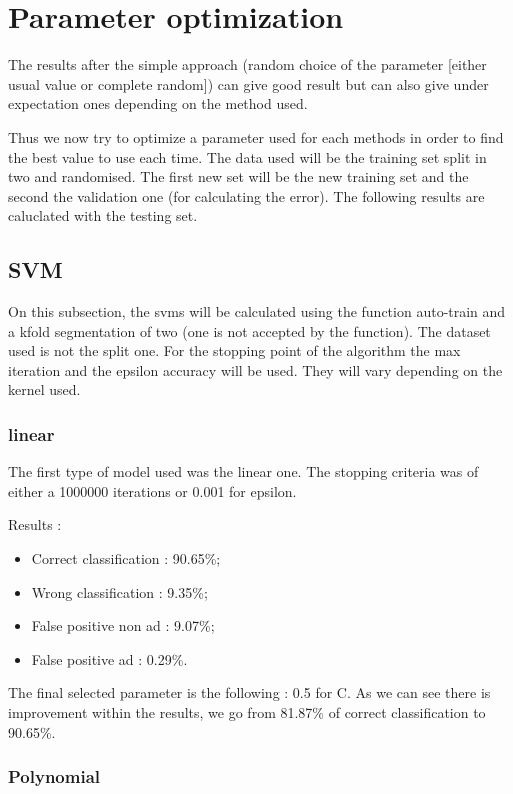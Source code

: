 \section{Parameter optimization}

The results after the simple approach (random choice of the parameter [either usual value or complete random]) can give good result but can also give under expectation ones depending on the method used.

Thus we now try to optimize a parameter used for each methods in order to find the best value to use each time. The data used will be the training set split in two and randomised. The first new set will be the new training set and the second the validation one (for calculating the error). The following results are caluclated with the testing set.

\subsection{SVM}

On this subsection, the svms will be calculated using the function auto-train and a kfold segmentation of two (one is not accepted by the function). The dataset used is not the split one.
For the stopping point of the algorithm the max iteration and the epsilon accuracy will be used. They will vary depending on the kernel used.

\subsubsection{linear}

The first type of model used was the linear one. The stopping criteria was of either a 1000000 iterations or 0.001 for epsilon.

Results :
\begin{itemize}
  \item Correct classification : 90.65\%;
  \item Wrong classification : 9.35\%;
  \item False positive non ad : 9.07\%;
  \item False positive ad : 0.29\%.
\end{itemize}

The final selected parameter is the following : 0.5 for C. As we can see there is improvement within the results, we go from 81.87\% of correct classification to 90.65\%.

\subsubsection{Polynomial}

